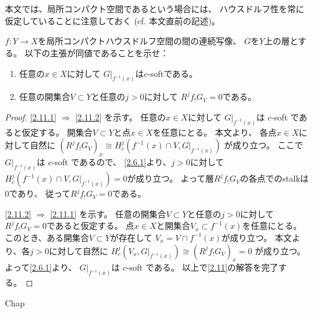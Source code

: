 \documentclass[uplatex,dvipdfmx]{jsarticle}
\begin{document}
\maketitle
\HeaderCommentA
\section{}

本文では、局所コンパクト空間であるという場合には、
ハウスドルフ性を常に仮定していることに注意しておく
(cf. 本文\cite[Proposition 2.5.1]{kashiwara2002sheaves}直前の記述)。
\fi


\begin{prob}\label{2.11}
  \(f:Y\to X\)を局所コンパクトハウスドルフ空間の間の連続写像、
  \(G\)を\(Y\)上の層とする。
  以下の主張が同値であることを示せ：
  \begin{enumerate}
    \item \label{2.11.1}
    任意の\(x\in X\)に対して
    \(G|_{f^{-1}(x)}\)は\(c\)-softである。
    \item \label{2.11.2}
    任意の開集合\(V\subset Y\)と任意の\(j>0\)に対して
    \(R^jf_!G_V=0\)である。
  \end{enumerate}
\end{prob}

\begin{proof}
  \ref{2.11.1} \(\Rightarrow\) \ref{2.11.2}
  を示す。
  任意の\(x\in X\)に対して
  \(G|_{f^{-1}(x)}\)は \(c\)-soft であると仮定する。
  開集合\(V\subset Y\)と点\(x\in X\)を任意にとる。
  本文\cite[Proposition 2.6.7]{kashiwara2002sheaves}より、
  各点\(x\in X\)に対して自然に
  \((R^jf_!G_V)_x \cong H^j_c(f^{-1}(x)\cap V,G|_{f^{-1}(x)})\)
  が成り立つ。
  ここで\(G|_{f^{-1}(x)}\)は \(c\)-soft であるので、
  \autoref{2.6.1}より、\(j>0\)に対して
  \(H^j_c(f^{-1}(x)\cap V,G|_{f^{-1}(x)})=0\)が成り立つ。
  よって層\(R^jf_!G_V\)の各点でのstalkは\(0\)であり、
  従って\(R^jf_!G_V=0\)である。

  \ref{2.11.2} \(\Rightarrow\) \ref{2.11.1}
  を示す。
  任意の開集合\(V\subset Y\)と任意の\(j>0\)に対して
  \(R^jf_!G_V=0\)であると仮定する。
  点\(x\in X\)と開集合\(V_x\subset f^{-1}(x)\)を任意にとる。
  このとき、ある開集合\(V\subset Y\)が存在して
  \(V_x = V\cap f^{-1}(x)\)が成り立つ。
  本文\cite[Proposition 2.6.7]{kashiwara2002sheaves}より、各\(j>0\)に対して自然に
  \(H^j_c(V_x,G|_{f^{-1}(x)}) \cong (R^jf_!G_V)_x = 0\)
  が成り立つ。
  よって\autoref{2.6.1}より、
  \(G|_{f^{-1}(x)}\)は \(c\)-soft である。
  以上で\autoref{2.11}の解答を完了する。
\end{proof}





\ifcsname Chap\endcsname\else
\printbibliography
\end{document}
